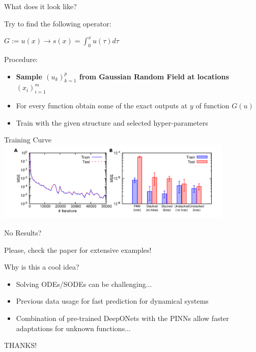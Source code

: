 \documentclass[aspectratio=169]{beamer}
\begin{document}
\begin{frame}{What does it look like?}
  \begin{minipage}{0.5\textwidth}
    \centering
    Try to find the following operator:

    $G:=u(x)\to s(x)=\int_0^x u(\tau)d\tau$

  \end{minipage}%
  \begin{minipage}{0.5\textwidth}
    \centering
    Procedure:
    \begin{itemize}
      \item \textbf{Sample $(u_k)_{k=1}^{p}$ from Gaussian  Random Field at locations $(x_i)_{i=1}^m$}
      \item For every function obtain some of the exact outputs at $y$ of function $G(u)$
      \item Train with the given structure and selected hyper-parameters 
    \end{itemize}
  \end{minipage}
\end{frame}

\begin{frame}{Training Curve}
  \centering
  \includegraphics[width=0.85\textwidth]{Figures/res.png}
\end{frame}

\begin{frame}{No Results?}

  \color{Pink} Please, check the paper for extensive examples!

\end{frame}

\begin{frame}{Why is this a cool idea?}
  \begin{itemize}
    \item Solving ODEs/SODEs can be challenging...
    \item Previous data usage for fast prediction for dynamical systems
    \item Combination of pre-trained DeepONets with the PINNs allow faster adaptations for unknown functions...
     \end{itemize} 
\end{frame}


\begin{frame}
    \color{Pink} 
    \centering
     THANKS!
\end{frame}
\end{document}
